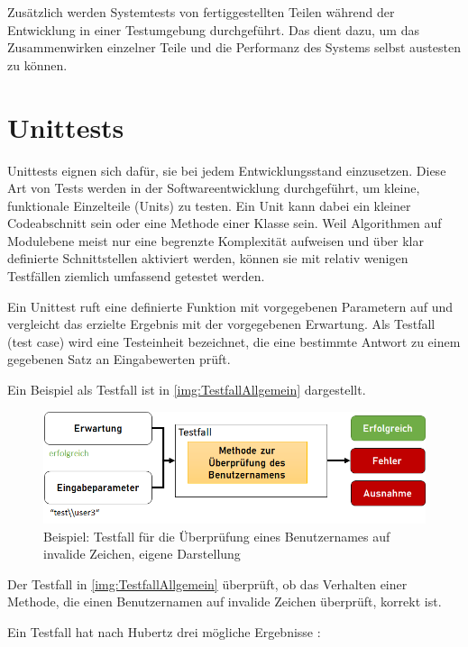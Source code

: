 \documentclass[a4paper,titlepage,halfparskip,12pt]{scrreprt}
\begin{document}
\begin{onehalfspacing}
Zusätzlich werden Systemtests von fertiggestellten Teilen während der Entwicklung in einer Testumgebung durchgeführt. Das dient dazu, um das Zusammenwirken einzelner Teile und die Performanz des Systems selbst austesten zu können.

\section{Unittests}
\label{Unittests}

Unittests eignen sich dafür, sie bei jedem Entwicklungsstand einzusetzen. Diese Art von Tests werden in der Softwareentwicklung durchgeführt, um kleine, funktionale Einzelteile (Units) zu testen. Ein Unit kann dabei ein kleiner Codeabschnitt sein oder eine Methode einer Klasse sein. Weil Algorithmen auf Modulebene meist nur eine begrenzte Komplexität aufweisen und über klar definierte Schnittstellen aktiviert werden, können sie mit relativ wenigen Testfällen ziemlich umfassend getestet werden.\cite{witte2019testmanagement, hubertz2016softwaretests}

Ein Unittest ruft eine definierte Funktion mit vorgegebenen Parametern auf und vergleicht das erzielte Ergebnis mit der vorgegebenen
Erwartung. Als Testfall (test case) wird eine Testeinheit bezeichnet, die eine bestimmte Antwort zu einem gegebenen Satz an Eingabewerten prüft.\cite{hubertz2016softwaretests}

Ein Beispiel als Testfall ist in \autoref{img:TestfallAllgemein} dargestellt.

\begin{figure}[h]
	\centering
	\includegraphics[width=.9\textwidth]{images/TestfallAllgemein}
	\caption{Beispiel: Testfall für die Überprüfung eines Benutzernames auf invalide Zeichen, eigene Darstellung}
	\label{img:TestfallAllgemein}
\end{figure}

Der Testfall in \autoref{img:TestfallAllgemein} überprüft, ob das Verhalten einer Methode, die einen Benutzernamen auf invalide Zeichen überprüft, korrekt ist.

Ein Testfall hat nach Hubertz drei mögliche Ergebnisse \cite{hubertz2016softwaretests}:


\end{onehalfspacing}
\end{document}
